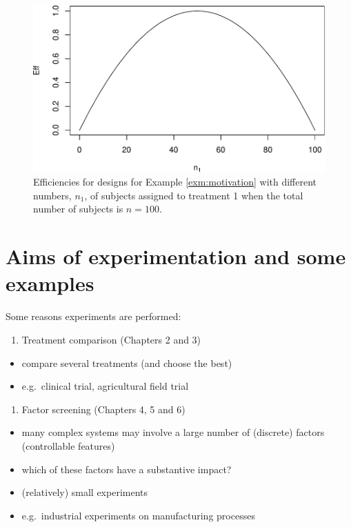 \documentclass[
]{book}
\providecommand{\tightlist}{%
  \setlength{\itemsep}{0pt}\setlength{\parskip}{0pt}}
\theoremstyle{definition}
\theoremstyle{definition}
\theoremstyle{definition}
\theoremstyle{definition}
\theoremstyle{remark}
\begin{document}
\begin{figure}
\centering
\includegraphics{bookdown_math3014-6027_files/figure-latex/simple-efficiency-1.pdf}
\caption{\label{fig:simple-efficiency}Efficiencies for designs for Example \ref{exm:motivation} with different numbers, \(n_1\), of subjects assigned to treatment 1 when the total number of subjects is \(n=100\).}
\end{figure}

\hypertarget{aims-of-experimentation-and-some-examples}{%
\section{Aims of experimentation and some examples}\label{aims-of-experimentation-and-some-examples}}

Some reasons experiments are performed:

\begin{enumerate}
\def\labelenumi{\arabic{enumi}.}
\tightlist
\item
  Treatment comparison (Chapters 2 and 3)
\end{enumerate}

\begin{itemize}
\tightlist
\item
  compare several treatments (and choose the best)
\item
  e.g.~clinical trial, agricultural field trial
\end{itemize}

\begin{enumerate}
\def\labelenumi{\arabic{enumi}.}
\setcounter{enumi}{1}
\tightlist
\item
  Factor screening (Chapters 4, 5 and 6)
\end{enumerate}

\begin{itemize}
\tightlist
\item
  many complex systems may involve a large number of (discrete) factors (controllable features)
\item
  which of these factors have a substantive impact?
\item
  (relatively) small experiments
\item
  e.g.~industrial experiments on manufacturing processes
\end{itemize}
\end{document}
